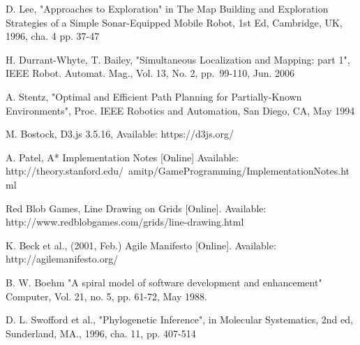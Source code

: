 \documentclass[authoryearcitations]{UoYCSproject}
\begin{document}
\begin{thebibliography}{56}
	D. Lee,
	"Approaches to Exploration" in The Map Building and Exploration Strategies of a Simple Sonar-Equipped Mobile Robot, 1st Ed, Cambridge, UK, 1996, cha. 4 pp. 37-47
	
	H. Durrant-Whyte, T. Bailey,
	"Simultaneous Localization and Mapping: part 1",
	IEEE Robot. Automat. Mag.,
	Vol. 13, No. 2, pp.~99-110,
	Jun. 2006
	
	A. Stentz,
	"Optimal and Efficient Path Planning for Partially-Known Environments",
	Proc. IEEE Robotics and Automation,
	San Diego, CA,
	May 1994
	
	M. Bostock,
	D3.js 3.5.16,
	Available: https://d3js.org/

	A. Patel,
	A* Implementation Notes [Online]
	Available: http://theory.stanford.edu/~amitp/GameProgramming/ImplementationNotes.html

	Red Blob Games,
	Line Drawing on Grids [Online].
	Available: http://www.redblobgames.com/grids/line-drawing.html
	
	K. Beck et al.,
	(2001, Feb.)
	Agile Manifesto [Online].
	Available: http://agilemanifesto.org/
	
	B. W. Boehm
	"A spiral model of software development and enhancement"
	Computer, 
	Vol. 21, no. 5, pp. 61-72, 
	May 1988.
	
	D. L. Swofford et al.,
	"Phylogenetic Inference", in Molecular Systematics,
	2nd ed, Sunderland, MA., 1996, cha. 11, pp. 407-514

\end{thebibliography}
\end{document}
